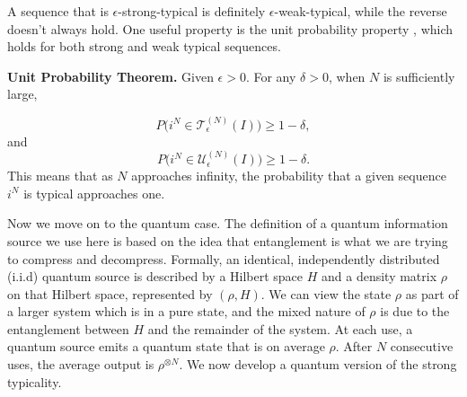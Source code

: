\documentclass[11pt]{article}
\begin{document}
A sequence that is $\epsilon$-strong-typical is definitely $\epsilon$-weak-typical, while the reverse doesn't always hold. One useful property is the unit probability property \cite{network}, which holds for both strong and weak typical sequences.

\textbf{Unit Probability Theorem.}
Given $\epsilon > 0$. For any $\delta > 0$, when $N$ is sufficiently large, 

\begin{equation}
    P \big(i^{N} \in
    \mathcal{T}_{\epsilon}^{(N)} (I) \big) \geq 1 - \delta,
\end{equation}
and
\begin{equation}
    P \big(i^{N} \in
    \mathcal{U}_{\epsilon}^{(N)} (I) \big) \geq 1 - \delta.
\end{equation}
This means that as $N$ approaches infinity, the probability that a given sequence $i^N$ is typical approaches one. 


\begin{comment}
Strong-typical sequences satisfy the following properties:

1. Let $P(i^N) = \Pi_{n=1}^N P(i_n)$. Then for each $i^N \in \mathcal{T}_{\epsilon}^{(N)} (I)$,

\begin{equation}
    2^{-N(H(I) + \delta(\epsilon))} \leq P(i^N)
    \leq  2^{-N(H(I) - \delta(\epsilon))}
\end{equation}
where $H(I) = -\sum_{i \in \mathcal{I}} P(i) \log P(i)$, $\delta(\epsilon) = \epsilon H(I)$.

2. \textbf{Unit Probability Theorem.} Given $\epsilon > 0$. For any $\delta > 0$, when $N$ is sufficiently large,

\begin{equation}
    P \big(i^{N} \in
    \mathcal{T}_{\epsilon}^{(N)} (I) \big) \geq 1 - \delta.
\end{equation}

3. The cardinality of the strong typical set is bounded as 

\begin{equation}
    (1-\epsilon) 2^{N (H(I) - \delta(\epsilon))}
    \leq |\mathcal{T}_{\epsilon}^{(N)} | \leq
    2^{N(H(I) + \delta(\epsilon))}.
\end{equation}
\end{comment}

Now we move on to the quantum case. The definition of a quantum information source \cite{NielsenChuang} we use here is based on the idea that entanglement is what we are trying to compress and decompress. Formally, an identical, independently distributed (i.i.d) quantum source is described by a Hilbert space $H$ and a density matrix $\rho$ on that Hilbert space, represented by $(\rho, H)$. We can view the state $\rho$ as part of a larger system which is in a pure state, and the mixed nature of $\rho$ is due to the entanglement between $H$ and the remainder of the system. At each use, a quantum source emits a quantum state that is on average $\rho$. After $N$ consecutive uses, the average output is $\rho^{\otimes N}$. We now develop a quantum version of the strong typicality.
\end{document}
